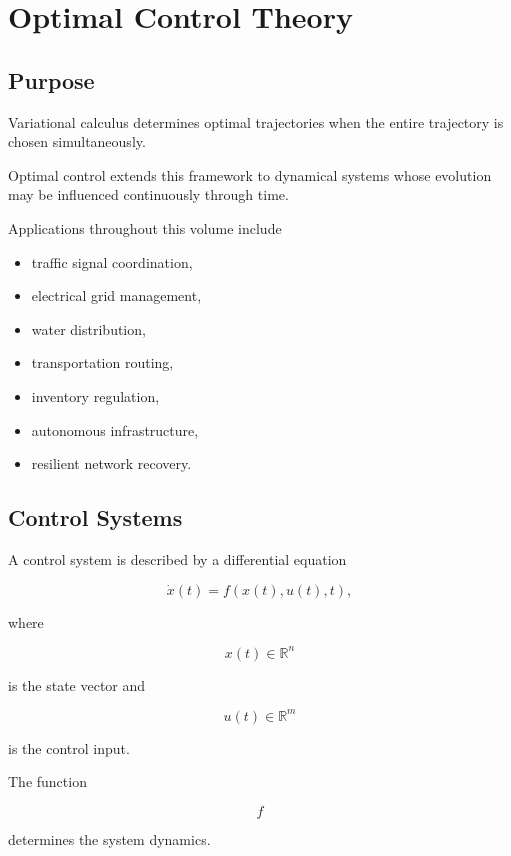 \documentclass[11pt,fleqn]{book}
\numberwithin{equation}{chapter}
\theoremstyle{plain}
\theoremstyle{definition}
\theoremstyle{remark}
\begin{document}
\chapter{Optimal Control Theory}

\section{Purpose}

Variational calculus determines optimal trajectories when the entire
trajectory is chosen simultaneously.

Optimal control extends this framework to dynamical systems whose
evolution may be influenced continuously through time.

Applications throughout this volume include

\begin{itemize}
\item traffic signal coordination,
\item electrical grid management,
\item water distribution,
\item transportation routing,
\item inventory regulation,
\item autonomous infrastructure,
\item resilient network recovery.
\end{itemize}


\section{Control Systems}

A control system is described by a differential equation

\[
\boxed{
\dot{x}(t)
=
f(x(t),u(t),t),
}
\]

where

\[
x(t)\in\mathbb{R}^n
\]

is the state vector and

\[
u(t)\in\mathbb{R}^m
\]

is the control input.

The function

\[
f
\]

determines the system dynamics.

\end{document}
